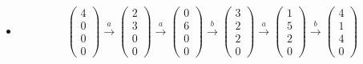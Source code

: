 \documentclass[a4paper]{scrartcl}
\begin{document}
\begin{enumerate}
\begin{itemize}
            \item
                \begin{equation}
                    \begin{pmatrix}
                        4 \\ 0 \\ 0 \\ 0
                    \end{pmatrix}
                    \stackrel{a}{\to}
                    \begin{pmatrix}
                        2 \\ 3 \\ 0 \\ 0
                    \end{pmatrix}
                    \stackrel{a}{\to}
                    \begin{pmatrix}
                        0 \\ 6 \\ 0 \\ 0
                    \end{pmatrix}
                    \stackrel{b}{\to}
                    \begin{pmatrix}
                        3 \\ 2 \\ 2 \\ 0
                    \end{pmatrix}
                    \stackrel{a}{\to}
                    \begin{pmatrix}
                        1 \\ 5 \\ 2 \\ 0
                    \end{pmatrix}
                    \stackrel{b}{\to}
                    \begin{pmatrix}
                        4 \\ 1 \\ 4 \\ 0
                    \end{pmatrix}
                \end{equation}
                

        \end{itemize}
        

\end{enumerate}
\end{document}
